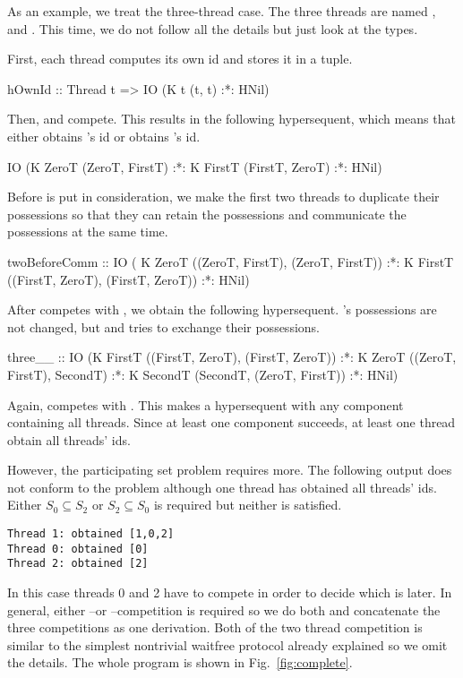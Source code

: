 As an example, we treat the three-thread case.  The three threads are
named \verb@ZeroT@, \verb@FirstT@ and \verb@SecondT@.
This time, we do not follow all the details but just look at the types.

First, each thread computes its own id and stores it in a tuple.
\begin{spec}
hOwnId :: Thread t => IO (K t (t, t) :*: HNil)
\end{spec}
Then, \verb@ZeroT@ and \verb@FirstT@ compete.  This results in the
following hypersequent, which means that either \verb@ZeroT@ obtains
\verb@FirstT@'s id or \verb@FirstT@ obtains \verb@ZeroT@'s id.
\begin{spec}
IO (K ZeroT (ZeroT, FirstT) :*:
    K FirstT (FirstT, ZeroT) :*: HNil)
\end{spec}

Before \verb@SecondT@ is put in consideration, we make the first two threads
to duplicate their possessions so that they can retain the possessions
and communicate the possessions at the same time.
\begin{spec}
twoBeforeComm :: IO (
                        K ZeroT ((ZeroT, FirstT), (ZeroT, FirstT)) :*:
                        K FirstT ((FirstT, ZeroT), (FirstT, ZeroT)) :*:
                        HNil)
\end{spec}

After \verb@SecondT@ competes with \verb@ZeroT@, we obtain the following
hypersequent.  \verb@FirstT@'s possessions are not changed, but \verb@ZeroT@ and
\verb@SecondT@ tries to exchange their possessions.
\begin{spec}
three__ :: IO
  (K FirstT ((FirstT, ZeroT), (FirstT, ZeroT)) :*:
   K ZeroT ((ZeroT, FirstT), SecondT) :*:
   K SecondT (SecondT, (ZeroT, FirstT)) :*: HNil)
\end{spec}
Again, \verb@SecondT@ competes with \verb@FirstT@.  This makes a hypersequent with
any component containing all threads.  Since at least one component succeeds,
at least one thread obtain all threads' ids.

However, the participating set problem requires more.  The following
output does not conform to the problem although one thread has obtained
all threads' ids.  Either $S_0 \subseteq S_2$ or $S_2\subseteq S_0$ is
required but neither is satisfied.
\begin{verbatim}
Thread 1: obtained [1,0,2]
Thread 0: obtained [0]
Thread 2: obtained [2]
\end{verbatim}
In this case threads 0 and 2 have to compete in order to decide which
is later.  In general, either \verb@ZeroT@--\verb@SecondT@ or
\verb@FirstT@--\verb@SecondT@ competition is required so we do both and
concatenate the three competitions as one derivation.
Both of the two thread competition is similar to the simplest nontrivial
waitfree protocol already explained so we omit the details.  The whole
program is shown in Fig.~\ref{fig:complete}.


